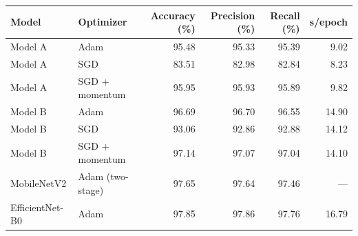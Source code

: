 \begin{tabular}{llrrrr}
\toprule
Model & Optimizer & Accuracy (\%) & Precision (\%) & Recall (\%) & s/epoch \\
\midrule
Model A & Adam & 95.48 & 95.33 & 95.39 & 9.02 \\
Model A & SGD & 83.51 & 82.98 & 82.84 & 8.23 \\
Model A & SGD + momentum & 95.95 & 95.93 & 95.89 & 9.82 \\
Model B & Adam & 96.69 & 96.70 & 96.55 & 14.90 \\
Model B & SGD & 93.06 & 92.86 & 92.88 & 14.12 \\
Model B & SGD + momentum & 97.14 & 97.07 & 97.04 & 14.10 \\
\midrule
MobileNetV2 & Adam (two-stage) & 97.65 & 97.64 & 97.46 & --- \\
EfficientNet-B0 & Adam & 97.85 & 97.86 & 97.76 & 16.79 \\
\bottomrule
\end{tabular}
